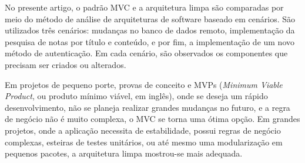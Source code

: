 No presente artigo, o padrão MVC e a arquitetura limpa são comparadas por meio do método de análise de arquiteturas de software baseado em cenários.
São utilizados três cenários: mudanças no banco de dados remoto, implementação da pesquisa de notas por título e conteúdo, e por fim, a implementação de um novo método de autenticação.
Em cada cenário, são observados os componentes que precisam ser criados ou alterados.

Em projetos de pequeno porte, provas de conceito e MVPs (\emph{Minimum Viable Product}, ou produto mínimo viável, em inglês), onde se deseja um rápido desenvolvimento, não se planeja realizar grandes mudanças no futuro, e a regra de negócio não é muito complexa, o MVC se torna uma ótima opção.
Em grandes projetos, onde a aplicação necessita de estabilidade, possui regras de negócio complexas, esteiras de testes unitários, ou até mesmo uma modularização em pequenos pacotes, a arquitetura limpa mostrou-se mais adequada.